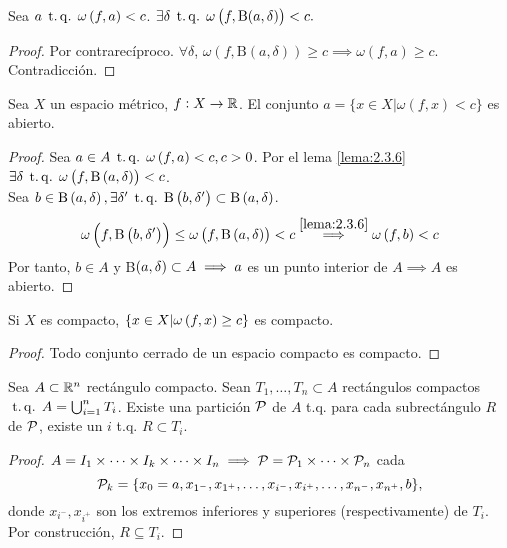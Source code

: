 \begin{lema} \label{lema:2.3.6}
    Sea $a \operatorname{\;t.q.\;} \omega \left( f, a \right) < c$. $\exists \delta \operatorname{\;t.q.\;} \omega \left( f, \text{B}(a, \delta) \right) < c.$
\end{lema}
\begin{proof}
    Por contrarecíproco. $\forall \delta$, $\omega \left( f, \text{B} \left( a, \delta \right) \right) \geq c \implies \omega \left( f, a \right) \geq c$. Contradicción.
\end{proof}
\begin{prop}
    Sea $X$ un espacio métrico, $f : X \to \mathbb{R}$. El conjunto $a = \{ x \in X | \omega \left( f, x \right) < c \}$ es abierto.
\end{prop}
\begin{proof}
    Sea $a \in A \operatorname{\;t.q.\;} \omega \left( f, a \right) < c, c > 0$. Por el lema \ref{lema:2.3.6} $\exists \delta \operatorname{\;t.q.\;} \omega \left( f, \text{B} \left( a, \delta \right) \right) < c$. \\
    Sea $b \in \text{B} \left( a, \delta \right), \exists \delta' \operatorname{\;t.q.\;} \text{B} \left( b, \delta' \right) \subset \text{B} \left( a, \delta \right)$.
    \[
    \omega \left( f, \text{B} \left( b, \delta' \right) \right) \leq \omega \left( f, \text{B} \left( a, \delta \right) \right) < c \stackrel{\ref{lema:2.3.6}}{\implies} \omega \left( f, b \right) < c
    \]
    Por tanto, $b \in A$ y B$\left( a, \delta \right) \subset A \implies a$ es un punto interior de $A \implies A$ es abierto.
\end{proof}
\begin{col*}
    \label{col:lebesgue}
    Si $X$ es compacto, $\{x \in X | \omega \left( f, x \right) \geq c\}$ es compacto.
\end{col*}
\begin{proof}
    Todo conjunto cerrado de un espacio compacto es compacto.
\end{proof}
\begin{lema}[(1)]\label{lema:teo_lebesgue}
    Sea $A \subset \mathbb{R}^n$ rectángulo compacto. Sean $T_1, \dots, T_n \subset A$ rectángulos compactos $\operatorname{\;t.q.\;} A = \bigcup_{i=1}^n T_i$. Existe una partición $\mathcal{P}$ de $A$ t.q. para cada subrectángulo $R$ de $\mathcal{P}$, existe un $i$ t.q. $R \subset T_i$.
\end{lema}
\begin{proof}
    $A = I_1 \times \dots \times I_k \times \dots \times I_n \implies \mathcal{P} = \mathcal{P}_1 \times \dots \times \mathcal{P}_n$ cada
    \[ \mathcal{P}_k = \{x_0 = a, x_{1^-}, x_{1^+}, \dots, x_{i^-}, x_{i^+}, \dots, x_{n^-}, x_{n^+}, b\}, \]
    donde $x_{i^-}, x_{i^+}$ son los extremos inferiores y superiores (respectivamente) de $T_i$. Por construcción, $R \subseteq T_i$.
\end{proof}
